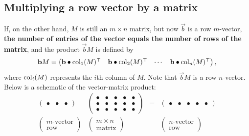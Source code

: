 \documentclass{ximera}
\begin{document}
\subsection{Multiplying a row vector by a matrix}
If, on the other hand, $M$ is still an $m\times n$ matrix, but now
$\vec{b}$ is a row $m$-vector, \textbf{the number of entries of the
  vector equals the number of rows of the matrix}, and the product
$\vec{b} M$ is defined by
\[
  \mathbf{b} M =
  \begin{pmatrix}
    \mathbf{b}\bullet \operatorname{col}_1(M)^\top &
    \mathbf{b}\bullet \operatorname{col}_2(M)^\top &
    \cdots &
    \mathbf{b}\bullet \operatorname{col}_n(M)^\top
  \end{pmatrix},
\]
where $\operatorname{col}_i(M)$ represents the $i$th column of $M$. Note that
$\vec{b} M$ is a row $n$-vector. Below is a schematic of
the vector-matrix product:
\[
  \begin{matrix}
    \begin{pmatrix}
      \bullet & \bullet & \bullet
    \end{pmatrix}
    &
      \begin{pmatrix}
        \bullet & \bullet & \bullet & \bullet & \bullet \\
        \bullet & \bullet & \bullet & \bullet & \bullet \\
        \bullet & \bullet & \bullet & \bullet & \bullet
      \end{pmatrix}
    &
      =
    &
      \begin{pmatrix}
        \bullet & \bullet & \bullet & \bullet & \bullet
      \end{pmatrix}
    \\
    \begin{pmatrix}
      m\text{-vector}\\
      \text{row}
    \end{pmatrix}
    &
      \begin{pmatrix}
        m\times n\\
        \text{matrix}
      \end{pmatrix}
    & &
        \begin{pmatrix}
          n\text{-vector}\\
          \text{row}
        \end{pmatrix}
  \end{matrix}
\]
\end{document}
